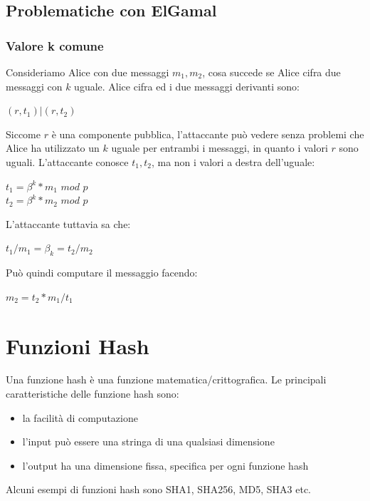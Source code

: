 \documentclass[11pt, oneside]{article}   	%
\begin{document}
\subsection*{Problematiche con ElGamal}
\subsubsection*{Valore k comune}
Consideriamo Alice con due messaggi $m_1, m_2$, cosa succede se Alice cifra due messaggi con $k$ uguale. Alice cifra ed i due messaggi derivanti sono:
\begin{center}
$(r, t_1) | (r, t_2)$
\end{center}
Siccome $r$  è una componente pubblica, l'attaccante può vedere senza problemi che Alice ha utilizzato un $k$ uguale per entrambi i messaggi, in quanto i valori $r$ sono uguali. L'attaccante conosce $t_1, t_2$, ma non i valori a destra dell'uguale:
\begin{center}
$t_1 = \beta^k * m_1$ $mod$ $p$\\
$t_2 = \beta^k * m_2$ $mod$ $p$
\end{center}
L'attaccante tuttavia sa che:
\begin{center}
$t_1/m_1 = \beta_k = t_2/m_2$
\end{center}
Può quindi computare il messaggio facendo:
\begin{center}
$m_2 = t_2  * m_1/t_1$
\end{center}

\section*{Funzioni Hash}
Una funzione hash è una funzione matematica/crittografica. Le principali caratteristiche delle funzione hash sono:\begin{itemize}
\item la facilità di computazione
\item l'input può essere una stringa di una qualsiasi dimensione
\item l'output ha una dimensione fissa, specifica per ogni funzione hash
\end{itemize}
Alcuni esempi di funzioni hash sono SHA1, SHA256, MD5, SHA3 etc.
\end{document}
